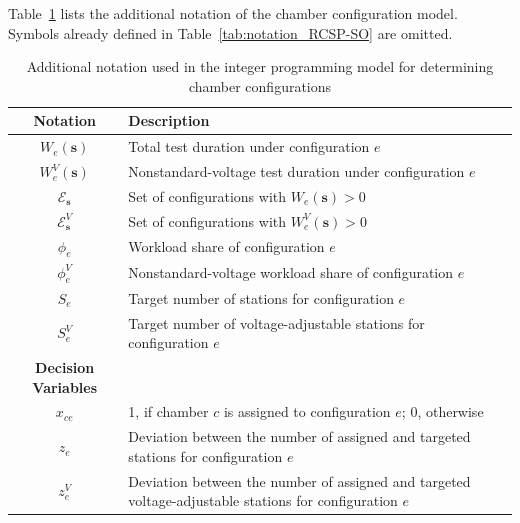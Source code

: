 Table~\ref{tab:notation_ccd} lists the additional notation of the chamber configuration model. Symbols already defined in Table~\ref{tab:notation_RCSP-SO} are omitted.

\begin{table}[H]
\caption{Additional notation used in the integer programming model for determining chamber configurations}
\label{tab:notation_ccd}
\centering
\small
\begin{tabular}{cl}
\toprule
\textbf{Notation} & \textbf{Description}\\
\midrule
\(W_e(\mathbf{s})\) & Total test duration under configuration \(e\) \\
\(W_e^V(\mathbf{s})\) & Nonstandard-voltage test duration under configuration \(e\) \\
\(\mathcal{E}_\mathbf{s}\) & Set of configurations with \(W_e(\mathbf{s})>0\) \\
\(\mathcal{E}^V_\mathbf{s}\) & Set of configurations with \(W_e^V(\mathbf{s})>0\) \\
\(\phi_e\) & Workload share of configuration \(e\) \\
\(\phi_e^V\) & Nonstandard-voltage workload share of configuration \(e\) \\
\(S_e\) & Target number of stations for configuration \(e\) \\
\(S_e^V\) & Target number of voltage-adjustable stations for configuration \(e\) \\
\midrule
\textbf{Decision Variables} & \\
\midrule
\(x_{ce}\) & 1, if chamber \(c\) is assigned to configuration \(e\); 0, otherwise \\
\(z_e\) & \shortstack[l]{Deviation between the number of assigned and\\targeted stations for configuration \(e\)} \\
\(z_e^V\) & \shortstack[l]{Deviation between the number of assigned and\\targeted voltage-adjustable stations for configuration \(e\)} \\
\bottomrule
\end{tabular}
\end{table}
